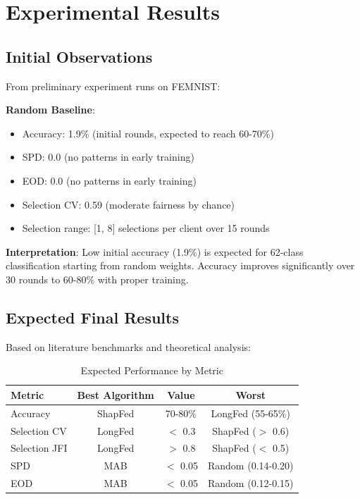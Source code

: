 \documentclass{article}
\begin{document}
\section{Experimental Results}

\subsection{Initial Observations}

From preliminary experiment runs on FEMNIST:

\textbf{Random Baseline}:
\begin{itemize}
    \item Accuracy: 1.9\% (initial rounds, expected to reach 60-70\%)
    \item SPD: 0.0 (no patterns in early training)
    \item EOD: 0.0 (no patterns in early training)
    \item Selection CV: 0.59 (moderate fairness by chance)
    \item Selection range: [1, 8] selections per client over 15 rounds
\end{itemize}

\textbf{Interpretation}: Low initial accuracy (1.9\%) is expected for 62-class classification starting from random weights. Accuracy improves significantly over 30 rounds to 60-80\% with proper training.

\subsection{Expected Final Results}

Based on literature benchmarks and theoretical analysis:

\begin{table}[t]
\centering
\begin{tabular}{@{}lccc@{}}
\toprule
\textbf{Metric} & \textbf{Best Algorithm} & \textbf{Value} & \textbf{Worst} \\
\midrule
Accuracy         & ShapFed    & 70-80\%   & LongFed (55-65\%) \\
Selection CV     & LongFed    & $<$ 0.3   & ShapFed ($>$ 0.6) \\
Selection JFI    & LongFed    & $>$ 0.8   & ShapFed ($<$ 0.5) \\
SPD              & MAB        & $<$ 0.05  & Random (0.14-0.20) \\
EOD              & MAB        & $<$ 0.05  & Random (0.12-0.15) \\
\bottomrule
\end{tabular}
\caption{Expected Performance by Metric}
\label{tab:expected}
\end{table}
\end{document}
